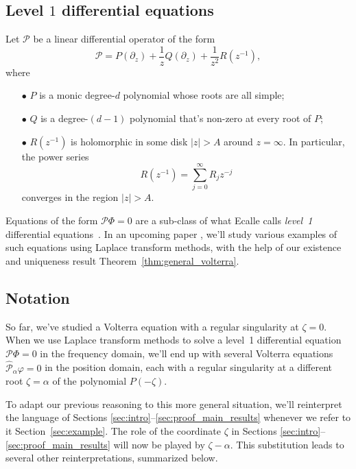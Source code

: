 \documentclass{article}
\theoremstyle{definition}
\theoremstyle{plain}
\begin{document}
\subsection{Level $1$ differential equations}\label{sec:level 1 ODE}
Let $\mathcal{P}$ be a linear differential operator of the form
\[ \mathcal{P} = P(\partial_z) + \frac{1}{z} Q(\partial_z) + \frac{1}{z^2} R(z^{-1}), \]
where
\begin{enumerate}
\item[$\bullet$] $P$ is a monic degree-$d$ polynomial whose roots are all simple; 
\item[$\bullet$] $Q$ is a degree-$(d-1)$ polynomial that's non-zero at every root of $P$;
\item[$\bullet$] $R(z^{-1})$ is holomorphic in some disk $|z| > A$ around $z = \infty$. In particular, the power series
\[ R(z^{-1}) = \sum_{j=0}^\infty R_j z^{-j} \]
converges in the region $|z| > A$.
\end{enumerate}
Equations of the form $\mathcal{P}\Phi = 0$ are a sub-class of what Ecalle calls {\em level~1} differential equations~\cite[Section~2.1]{EcalleIII}\cite[Section~5.2.2.1]{diverg-resurg-iii}. In an upcoming paper \cite{borel_reg}, we'll study various examples of such equations using Laplace transform methods, with the help of our existence and uniqueness result Theorem~\ref{thm:general_volterra}. 
\subsection{Notation}\label{sec:notation_alpha}
So far, we've studied a Volterra equation with a regular singularity at $\zeta = 0$. When we use Laplace transform methods to solve a level~1 differential equation $\mathcal{P}\Phi = 0$ in the frequency domain, we'll end up with several Volterra equations $\hat{\mathcal{P}}_\alpha \varphi = 0$ in the position domain, each with a regular singularity at a different root $\zeta = \alpha$ of the polynomial $P(-\zeta)$.

To adapt our previous reasoning to this more general situation, we'll reinterpret the language of Sections \ref{sec:intro}--\ref{sec:proof_main_results} whenever we refer to it Section~\ref{sec:example}. The role of the coordinate $\zeta$ in Sections \ref{sec:intro}--\ref{sec:proof_main_results} will now be played by $\zeta-\alpha$. This substitution leads to several other reinterpretations, summarized below.
\end{document}
